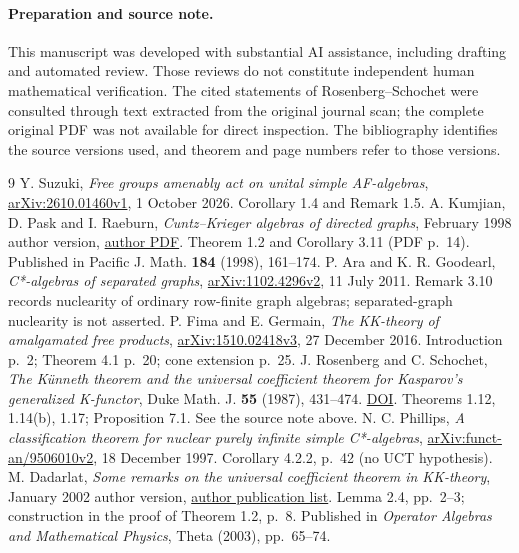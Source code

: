 \documentclass[11pt]{article}
\theoremstyle{remark}\newtheorem{remark}[theorem]{Remark}
\begin{document}
\paragraph{Preparation and source note.}
This manuscript was developed with substantial AI assistance, including
drafting and automated review. Those reviews do not constitute independent
human mathematical verification. The cited statements of Rosenberg--Schochet
were consulted through text extracted from the original journal scan;
the complete original PDF was not available for direct inspection.
The bibliography identifies the source versions used, and theorem and page
numbers refer to those versions.

\begin{thebibliography}{9}
 Y. Suzuki, \emph{Free groups amenably act on unital simple
AF-algebras}, \href{https://arxiv.org/abs/2610.01460v1}{arXiv:2610.01460v1},
1 October 2026. Corollary 1.4 and Remark 1.5.
 A. Kumjian, D. Pask and I. Raeburn,
\emph{Cuntz--Krieger algebras of directed graphs}, February 1998 author
version, \href{https://documents.uow.edu.au/~dpask/index_files/papers/ckaodg.pdf}{author PDF}.
Theorem 1.2 and Corollary 3.11 (PDF p.~14). Published in Pacific J. Math.
\textbf{184} (1998), 161--174.
 P. Ara and K. R. Goodearl, \emph{C*-algebras of separated
graphs}, \href{https://arxiv.org/abs/1102.4296v2}{arXiv:1102.4296v2},
11 July 2011. Remark 3.10 records nuclearity of ordinary row-finite graph
algebras; separated-graph nuclearity is not asserted.
 P. Fima and E. Germain, \emph{The KK-theory of amalgamated
free products}, \href{https://arxiv.org/abs/1510.02418v3}{arXiv:1510.02418v3},
27 December 2016. Introduction p.~2; Theorem 4.1 p.~20; cone extension p.~25.
 J. Rosenberg and C. Schochet, \emph{The K\"unneth theorem
and the universal coefficient theorem for Kasparov's generalized K-functor},
Duke Math. J. \textbf{55} (1987), 431--474.
\href{https://doi.org/10.1215/S0012-7094-87-05524-4}{DOI}.
Theorems 1.12, 1.14(b), 1.17; Proposition 7.1. See the source note above.
 N. C. Phillips, \emph{A classification theorem for nuclear
purely infinite simple C*-algebras},
\href{https://arxiv.org/abs/funct-an/9506010v2}{arXiv:funct-an/9506010v2},
18 December 1997. Corollary 4.2.2, p.~42 (no UCT hypothesis).
 M. Dadarlat, \emph{Some remarks on the universal
coefficient theorem in KK-theory}, January 2002 author version,
\href{https://www.math.purdue.edu/~mdd/Papers.html}{author publication list}.
Lemma 2.4, pp.~2--3; construction in the proof of Theorem 1.2, p.~8.
Published in \emph{Operator Algebras and Mathematical Physics},
Theta (2003), pp.~65--74.
\end{thebibliography}
\end{document}
